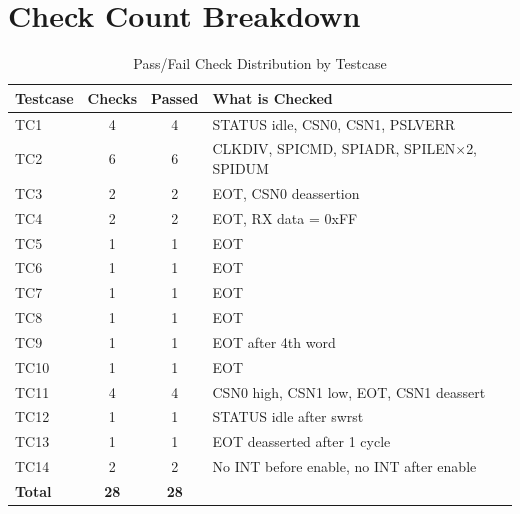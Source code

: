 \section{Check Count Breakdown}

\begin{table}[H]
\centering
\caption{Pass/Fail Check Distribution by Testcase}
\label{tab:check_dist}
\begin{tabular}{@{}lccl@{}}
\toprule
\textbf{Testcase} & \textbf{Checks} & \textbf{Passed} & \textbf{What is Checked} \\
\midrule
TC1  & 4 & 4 & STATUS idle, CSN0, CSN1, PSLVERR \\
TC2  & 6 & 6 & CLKDIV, SPICMD, SPIADR, SPILEN$\times$2, SPIDUM \\
TC3  & 2 & 2 & EOT, CSN0 deassertion \\
TC4  & 2 & 2 & EOT, RX data = 0xFF \\
TC5  & 1 & 1 & EOT \\
TC6  & 1 & 1 & EOT \\
TC7  & 1 & 1 & EOT \\
TC8  & 1 & 1 & EOT \\
TC9  & 1 & 1 & EOT after 4th word \\
TC10 & 1 & 1 & EOT \\
TC11 & 4 & 4 & CSN0 high, CSN1 low, EOT, CSN1 deassert \\
TC12 & 1 & 1 & STATUS idle after swrst \\
TC13 & 1 & 1 & EOT deasserted after 1 cycle \\
TC14 & 2 & 2 & No INT before enable, no INT after enable \\
\midrule
\textbf{Total} & \textbf{28} & \textbf{28} & \\
\bottomrule
\end{tabular}
\end{table}
